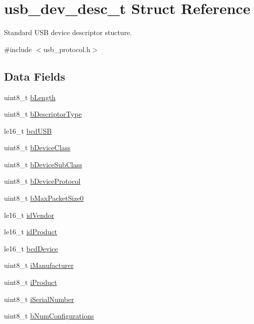 \hypertarget{structusb__dev__desc__t}{
\section{usb\-\_\-dev\-\_\-desc\-\_\-t \-Struct \-Reference}
\label{structusb__dev__desc__t}
}


\-Standard \-U\-S\-B device descriptor stucture.  




{\ttfamily \#include $<$usb\-\_\-protocol.\-h$>$}

\subsection*{\-Data \-Fields}
\begin{DoxyCompactItemize}
\item 
uint8\-\_\-t \hyperlink{structusb__dev__desc__t_af4db977f6cd877847a47fc2c9f23507d}{b\-Length}
\item 
uint8\-\_\-t \hyperlink{structusb__dev__desc__t_a840d4136b9b6662fb2bab49053949c1b}{b\-Descriptor\-Type}
\item 
le16\-\_\-t \hyperlink{structusb__dev__desc__t_a45f7d74df9688a10a41a69de613d0191}{bcd\-U\-S\-B}
\item 
uint8\-\_\-t \hyperlink{structusb__dev__desc__t_a64f6606c681beb18f1d13d701d1264c2}{b\-Device\-Class}
\item 
uint8\-\_\-t \hyperlink{structusb__dev__desc__t_a49aec064889f05135fdf38bc94e41c47}{b\-Device\-Sub\-Class}
\item 
uint8\-\_\-t \hyperlink{structusb__dev__desc__t_a7247d3a045b2fc63569651cfeb059401}{b\-Device\-Protocol}
\item 
uint8\-\_\-t \hyperlink{structusb__dev__desc__t_a382212d11df623e7c4b7d4787892f551}{b\-Max\-Packet\-Size0}
\item 
le16\-\_\-t \hyperlink{structusb__dev__desc__t_a929b87a9372d2fb886cdfa9ac50108df}{id\-Vendor}
\item 
le16\-\_\-t \hyperlink{structusb__dev__desc__t_a5102924a87c42fb7d962e6f51df913be}{id\-Product}
\item 
le16\-\_\-t \hyperlink{structusb__dev__desc__t_ace438955df22cd6527b8f1d543c41aed}{bcd\-Device}
\item 
uint8\-\_\-t \hyperlink{structusb__dev__desc__t_ac981257b49a80b33109a3c9221e222ef}{i\-Manufacturer}
\item 
uint8\-\_\-t \hyperlink{structusb__dev__desc__t_a2b7a0e3e8fc29da7fb47dbeb507556ad}{i\-Product}
\item 
uint8\-\_\-t \hyperlink{structusb__dev__desc__t_aada14a1b1dd2a396544624c21ed84291}{i\-Serial\-Number}
\item 
uint8\-\_\-t \hyperlink{structusb__dev__desc__t_ae1e58f9b7987e22fde8306ad4a3e50a8}{b\-Num\-Configurations}
\end{DoxyCompactItemize}


